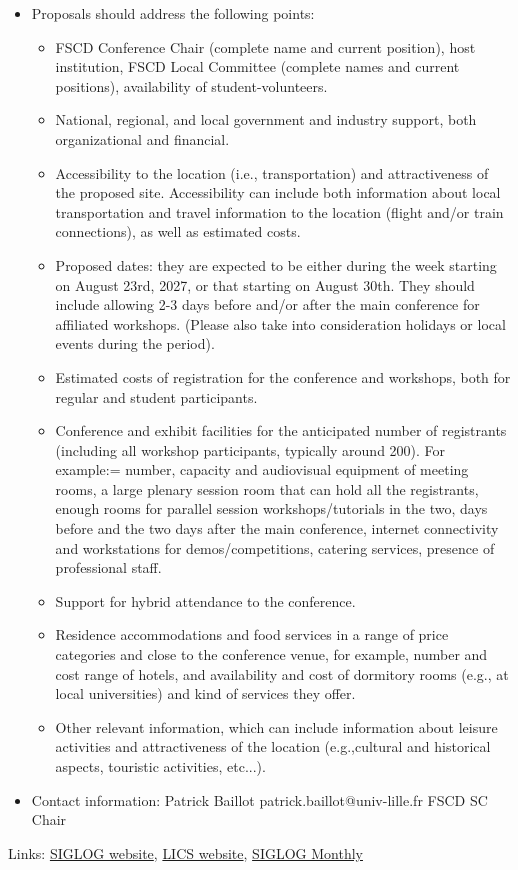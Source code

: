 \documentclass[prodmode,acmtecs]{acmsmall} %
\begin{document}
\begin{itemize}
\item  Proposals should address the following points: 
 
\begin{itemize}\item  FSCD Conference Chair (complete name and current position), host institution, FSCD Local Committee (complete names and current positions), availability of student-volunteers. 
\item  National, regional, and local government and industry support, both organizational and financial.
\item  Accessibility to the location (i.e., transportation) and attractiveness of the proposed site. Accessibility can include both information about local transportation and travel information to the location (flight and/or train connections), as well as estimated costs.
\item  Proposed dates: they are expected to be either during the week starting on August 23rd, 2027, or that starting on August 30th. They should include allowing 2-3 days before and/or after the main conference for affiliated workshops. (Please also take into consideration holidays or local events during the period).
\item  Estimated costs of registration for the conference and workshops, both for regular and student participants.
\item  Conference and exhibit facilities for the anticipated number of registrants (including all workshop participants, typically around 200). For example:= number, capacity and audiovisual equipment of meeting rooms, a large plenary session room that can hold all the registrants, enough rooms for parallel session workshops/tutorials in the two, days before and the two days after the main conference, internet connectivity and workstations for demos/competitions, catering services, presence of professional staff.
\item  Support for hybrid attendance to the conference.
\item  Residence accommodations and food services in a range of price categories and close to the conference venue, for example, number and cost range of hotels, and availability and cost of dormitory rooms (e.g., at local universities) and kind of services they offer.
\item  Other relevant information, which can include information about leisure activities and attractiveness of the location (e.g.,cultural and historical aspects, touristic activities, etc...).
\end{itemize} 
\item  Contact information: Patrick Baillot patrick.baillot@univ-lille.fr FSCD SC Chair 
 
\end{itemize}


\bigskip Links: \href{http://siglog.org/}{SIGLOG website}, \href{https://lics.siglog.org}{LICS website}, \href{https://lics.siglog.org/newsletters/}{SIGLOG Monthly}
\end{document}
